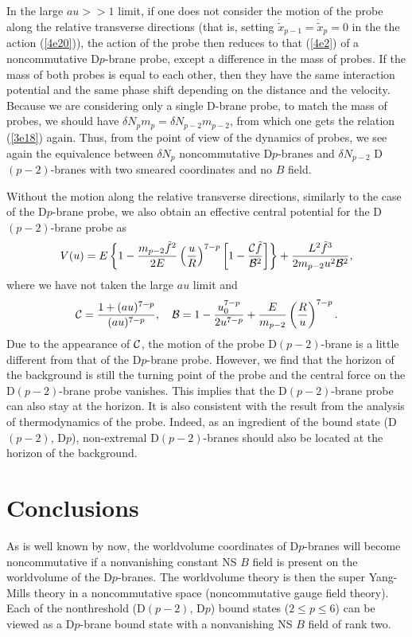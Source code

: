 \documentclass[a4paper,12pt]{article}
\newcommand{\sect}[1]{\setcounter{equation}{0}\section{#1}}
\begin{document}
In the large $au>>1$ limit, if one does not consider the motion of the
probe along the relative transverse directions (that is, setting
$\dot{\tilde x}_{p-1} =\dot{\tilde{x}}_p=0$ in the the action (\ref{4e20})),
the action of the probe then reduces to that (\ref{4e2}) of
a noncommutative D$p$-brane probe, except a difference in the mass of probes.
If the mass of both probes is equal to each other, then they have the same
interaction potential and the same phase shift depending on the distance
and the velocity. Because we are considering only a single D-brane probe,
to match the mass of probes, we should have $\delta N_p m_p=\delta N_{p-2}
m_{p-2}$, from which one gets the relation (\ref{3e18}) again. Thus, from
the point of view of the dynamics of probes, we see again the equivalence
between $\delta N_p$ noncommutative D$p$-branes and $\delta N_{p-2}$
D$(p-2)$-branes with two smeared coordinates and no $B$ field.

Without the motion along the relative transverse directions,
similarly to the case of the D$p$-brane probe, we also obtain an effective
central potential for the D$(p-2)$-brane probe as
\begin{equation}
\label{dp2pot}
V(u)= E\left \{ 1-\frac{m_{p-2}\tilde{f}^2}{2E}
 \left(\frac{u}{R}\right)^{7-p}\left [1-\frac{{\cal C} \tilde{f}}
 {{\cal B}^2}\right] \right\}
 +\frac{L^2 \tilde{f}^3}{2m_{p-2}u^2 {\cal B}^2},
\end{equation}
where we have not taken the large $au$ limit and
\begin{equation}
{\cal C}=\frac{1+(au)^{7-p}}{(au)^{7-p}}, \ \ \
{\cal B}=1-\frac{u_0^{7-p}}{2u^{7-p}}
 +\frac{E}{m_{p-2}}\left(\frac{R}{u}\right)^{7-p}.
\end{equation}
Due to the appearance of ${\cal C}$, the motion of the probe D$(p-2)$-brane
is a little different from that of the D$p$-brane probe. However, we find
that the horizon of the background is still the turning point of the probe
and the central force on the D$(p-2)$-brane probe vanishes. This implies that
the D$(p-2)$-brane probe can also stay at the horizon. It is also consistent
with the result from the analysis of thermodynamics of the probe. Indeed, as
an ingredient of the bound state (D$(p-2)$, D$p$), non-extremal
D$(p-2)$-branes should also be located at the horizon of the background.


\sect{Conclusions}

As is well known by now, the worldvolume coordinates of D$p$-branes will
become noncommutative if a nonvanishing constant NS $B$ field is present
on the worldvolume of the D$p$-branes. The worldvolume theory is then the
super Yang-Mills theory in a noncommutative space (noncommutative
gauge field theory). Each of the nonthreshold (D$(p-2)$, D$p$) bound states
($2 \le p \le 6$) can be viewed as a D$p$-brane bound state with a
nonvanishing NS $B$ field of rank two.
\end{document}
